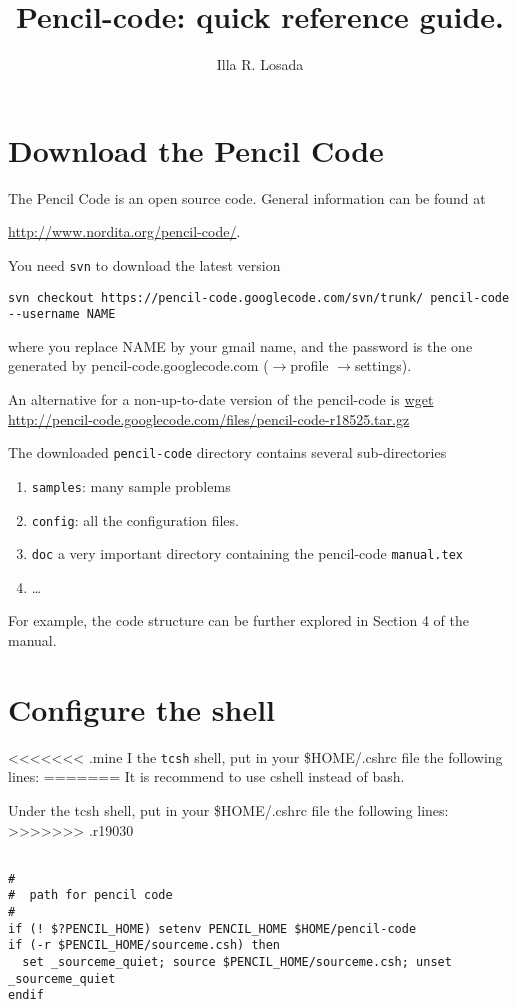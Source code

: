 \documentclass[a4paper,12pt]{article}
\title{Pencil-code: quick reference guide.}
\author{Illa R. Losada}
\date{}
\begin{document}
\maketitle

\tableofcontents

\newpage

\section{Download the Pencil Code}
The Pencil Code is an open source code. General information can be found at

\url{http://www.nordita.org/pencil-code/}.


You need \verb|svn| to download the latest version 
\begin{verbatim}
svn checkout https://pencil-code.googlecode.com/svn/trunk/ pencil-code
--username NAME
\end{verbatim}

where you replace NAME by your gmail name, and the password is the
one generated by pencil-code.googlecode.com ($\rightarrow$profile
$\rightarrow$settings). 

An alternative for a non-up-to-date version of the pencil-code is
\url{
wget http://pencil-code.googlecode.com/files/pencil-code-r18525.tar.gz
}

The downloaded \verb|pencil-code| directory contains several sub-directories
\begin{enumerate}
  \item \verb|samples|:  many sample problems
  \item \verb|config|: all the configuration files.
  \item \verb|doc| a very important directory containing the pencil-code
    \verb|manual.tex|
  \item \dots
\end{enumerate}
For example, the code structure can be further explored in Section 4 of the
manual.

\section{Configure the shell}

<<<<<<< .mine
I the \verb|tcsh| shell, put in your \$HOME/.cshrc file the following lines:
=======
It is recommend to use cshell instead of bash.

Under the tcsh shell, put in your \$HOME/.cshrc file the following lines:
>>>>>>> .r19030
\begin{verbatim}

#
#  path for pencil code
#
if (! $?PENCIL_HOME) setenv PENCIL_HOME $HOME/pencil-code
if (-r $PENCIL_HOME/sourceme.csh) then
  set _sourceme_quiet; source $PENCIL_HOME/sourceme.csh; unset _sourceme_quiet
endif
\end{verbatim}
\end{document}
